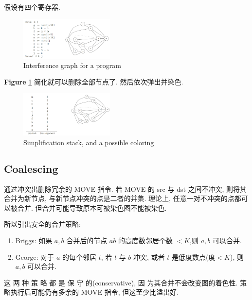 \begin{example}
    假设有四个寄存器. 

    \begin{figure}[!htb]
        \centering
        \includegraphics[width=0.42\textwidth]{pic/CP11/Interference graph for a program}
        \caption{Interference graph for a program}
        \label{fig:Interference-graph}
    \end{figure}
    
    \textbf{Figure} \ref{fig:Interference-graph} 简化就可以删除全部节点了. 然后依次弹出并染色. 

    \begin{figure}[!htb]
        \centering
        \includegraphics[width=0.42\textwidth]{pic/CP11/Simplification stack, and a possible coloring}
        \caption{Simplification stack, and a possible coloring}
    \end{figure}
    
    
\end{example}

\subsection{Coalescing}
通过冲突出删除冗余的 MOVE 指令. 若 MOVE 的 src 与 dst 之间不冲突, 则将其合并为新节点, 与新节点冲突的点是二者的并集. 理论上, 任意一对不冲突的点都可以被合并. 但合并可能导致原本可被染色图不能被染色. 

所以引出安全的合并策略:
\begin{enumerate}
    \item Briggs: 如果 $a,b$ 合并后的节点 $ab$ 的高度数邻居个数 $<K$,则 $a, b$ 可以合并.
    \item George: 对于 $a$ 的每个邻居 $t$, 若 $t$ 与 $b$ 冲突, 或者 $t$ 是低度数点(度$<K$), 则 $a,b$ 可以合并. 
\end{enumerate}

这 两 种 策 略 都 是 保 守 的(conservative), 因 为其合并不会改变图的着色性. 策略执行后可能仍有多余的 MOVE 指令, 但这至少比溢出好.


